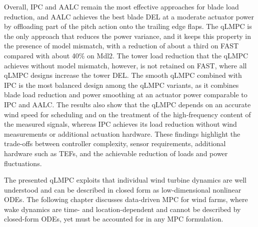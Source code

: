 Overall, IPC and AALC remain the most effective approaches for blade load reduction, and AALC
achieves the best blade DEL at a moderate actuator power by offloading part of the pitch action
onto the trailing edge flaps. The qLMPC is the only approach that reduces the power variance, and
it keeps this property in the presence of model mismatch, with a reduction of about a third on
FAST compared with about 40\% on Mdl2. The tower load reduction that the qLMPC achieves without
model mismatch, however, is not retained on FAST, where all qLMPC designs increase the tower DEL.
The smooth qLMPC combined with IPC is the most balanced design among the qLMPC variants, as it
combines blade load reduction and power smoothing at an actuator power comparable to IPC and
AALC. The results also show that the qLMPC depends on an accurate wind speed for scheduling and
on the treatment of the high-frequency content of the measured signals, whereas IPC achieves its
load reduction without wind measurements or additional actuation hardware. These findings
highlight the trade-offs between controller complexity, sensor requirements, additional hardware
such as TEFs, and the achievable reduction of loads and power fluctuations.

The presented qLMPC exploits that individual wind turbine dynamics are well understood and can
be described in closed form as low-dimensional nonlinear ODEs. The following chapter discusses
data-driven MPC for wind farms, where wake dynamics are time- and location-dependent and cannot
be described by closed-form ODEs, yet must be accounted for in any MPC formulation.
